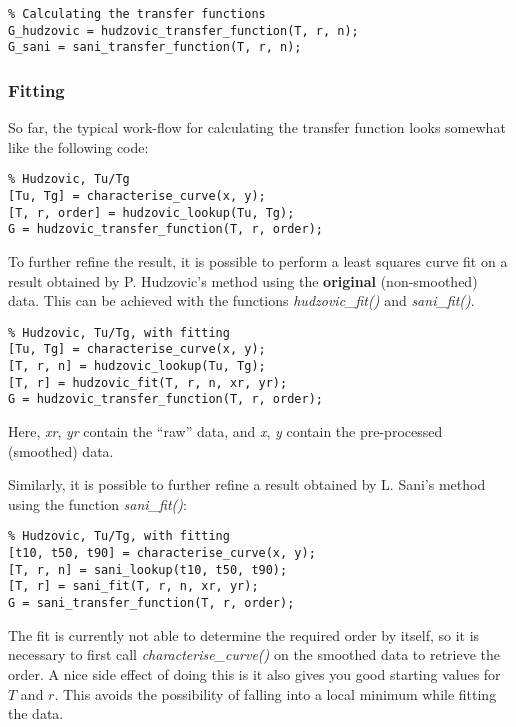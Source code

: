 \begin{lstlisting}
% Calculating the transfer functions
G_hudzovic = hudzovic_transfer_function(T, r, n);
G_sani = sani_transfer_function(T, r, n);
\end{lstlisting}


\subsubsection*{Fitting}

So  far,  the  typical  work-flow  for  calculating  the transfer function looks
somewhat like the following code:

\begin{lstlisting}
% Hudzovic, Tu/Tg
[Tu, Tg] = characterise_curve(x, y);
[T, r, order] = hudzovic_lookup(Tu, Tg);
G = hudzovic_transfer_function(T, r, order);
\end{lstlisting}

To  further  refine  the result, it is possible to perform a least squares curve
fit on a result  obtained  by  P.  Hudzovic's method using the \textbf{original}
(non-smoothed)    data.    This    can   be   achieved   with   the    functions
\textit{hudzovic\_fit()} and \textit{sani\_fit()}.

\begin{lstlisting}
% Hudzovic, Tu/Tg, with fitting
[Tu, Tg] = characterise_curve(x, y);
[T, r, n] = hudzovic_lookup(Tu, Tg);
[T, r] = hudzovic_fit(T, r, n, xr, yr);
G = hudzovic_transfer_function(T, r, order);
\end{lstlisting}

Here,  \textit{xr},  \textit{yr}  contain  the  ``raw''  data,  and  \textit{x},
\textit{y} contain the pre-processed (smoothed) data.

Similarly, it is  possible  to  further  refine  a  result obtained by L. Sani's
method using the function \textit{sani\_fit()}:

\begin{lstlisting}
% Hudzovic, Tu/Tg, with fitting
[t10, t50, t90] = characterise_curve(x, y);
[T, r, n] = sani_lookup(t10, t50, t90);
[T, r] = sani_fit(T, r, n, xr, yr);
G = sani_transfer_function(T, r, order);
\end{lstlisting}

The fit is currently not  able  to determine the required order by itself, so it
is necessary to first call \textit{characterise\_curve()} on  the  smoothed data
to retrieve the order. A nice  side  effect  of  doing this is it also gives you
good starting values for $T$ and $r$. This  avoids  the  possibility  of falling
into a local minimum while fitting the data.

